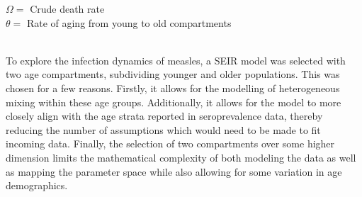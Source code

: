 \documentclass[../Paper.tex]{subfiles}
\begin{document}
 $\Omega = $ Crude death rate \\
 $\theta = $ Rate of aging from young to old compartments \\
\\
\raggedright
To explore the infection dynamics of measles, a SEIR model was selected with two
age compartments, subdividing younger and older populations. This was chosen for a few
reasons. Firstly, it allows for the modelling of heterogeneous mixing within
these age groups. Additionally, it allows for the model to more closely
align with the age strata reported in seroprevalence data, thereby reducing the
number of assumptions which would need to be made to fit incoming data.
Finally, the selection of two compartments over some higher dimension limits
the mathematical complexity of both modeling the data as well as mapping the
parameter space while also allowing for some variation in age demographics.

\clearpage
\end{document}
